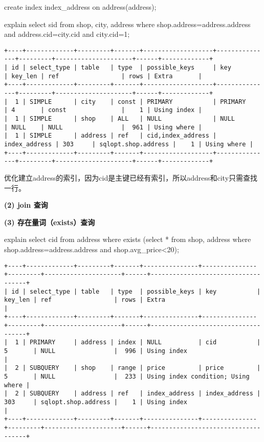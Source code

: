 \documentclass[a4paper, 11pt, nofonts, nocap, fancyhdr]{ctexart}
\begin{document}
create index index\_address on address(address);

explain select sid from shop, city, address where shop.address=address.address and address.cid=city.cid and city.cid=1;

\begin{verbatim}
+----+-------------+---------+-------+-------------------+---------------+---------+---------------------+------+-------------+
| id | select_type | table   | type  | possible_keys     | key           | key_len | ref                 | rows | Extra       |
+----+-------------+---------+-------+-------------------+---------------+---------+---------------------+------+-------------+
|  1 | SIMPLE      | city    | const | PRIMARY           | PRIMARY       | 4       | const               |    1 | Using index |
|  1 | SIMPLE      | shop    | ALL   | NULL              | NULL          | NULL    | NULL                |  961 | Using where |
|  1 | SIMPLE      | address | ref   | cid,index_address | index_address | 303     | sqlopt.shop.address |    1 | Using where |
+----+-------------+---------+-------+-------------------+---------------+---------+---------------------+------+-------------+
\end{verbatim}

优化建立address的索引，因为cid是主键已经有索引，所以address和city只需查找一行。

\vspace{0.7cm}

\textbf{(2) join 查询} 

\vspace{0.7cm}

\textbf{(3) 存在量词（exists）查询} 

explain select cid from address where exists (select * from shop, address where shop.address=address.address and shop.avg\_price<20);

\begin{verbatim}
+----+-------------+---------+-------+---------------+---------------+---------+---------------------+------+------------------------------------+
| id | select_type | table   | type  | possible_keys | key           | key_len | ref                 | rows | Extra                              |
+----+-------------+---------+-------+---------------+---------------+---------+---------------------+------+------------------------------------+
|  1 | PRIMARY     | address | index | NULL          | cid           | 5       | NULL                |  996 | Using index                        |
|  2 | SUBQUERY    | shop    | range | price         | price         | 5       | NULL                |  233 | Using index condition; Using where |
|  2 | SUBQUERY    | address | ref   | index_address | index_address | 303     | sqlopt.shop.address |    1 | Using index                        |
+----+-------------+---------+-------+---------------+---------------+---------+---------------------+------+------------------------------------+
\end{verbatim}
\end{document}
